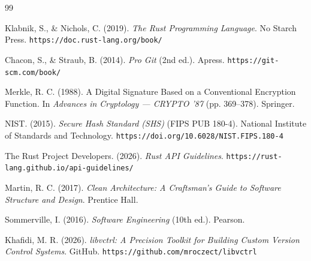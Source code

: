 \documentclass[11pt,a4paper]{article}
\begin{document}
\begin{thebibliography}{99}

	Klabnik, S., \& Nichols, C. (2019).
	\textit{The Rust Programming Language}.
	No Starch Press.
	\texttt{https://doc.rust-lang.org/book/}

	Chacon, S., \& Straub, B. (2014).
	\textit{Pro Git} (2nd ed.).
	Apress.
	\texttt{https://git-scm.com/book/}

	Merkle, R. C. (1988).
	A Digital Signature Based on a Conventional Encryption Function.
	In \textit{Advances in Cryptology --- CRYPTO '87}
	(pp. 369--378). Springer.

	NIST. (2015).
	\textit{Secure Hash Standard (SHS)} (FIPS PUB 180-4).
	National Institute of Standards and Technology.
	\texttt{https://doi.org/10.6028/NIST.FIPS.180-4}

	The Rust Project Developers. (2026).
	\textit{Rust API Guidelines}.
	\texttt{https://rust-lang.github.io/api-guidelines/}

	Martin, R. C. (2017).
	\textit{Clean Architecture: A Craftsman's Guide to Software Structure and Design}.
	Prentice Hall.

	Sommerville, I. (2016).
	\textit{Software Engineering} (10th ed.).
	Pearson.

	Khafidi, M. R. (2026).
	\textit{libvctrl: A Precision Toolkit for Building Custom Version Control Systems}.
	GitHub.
	\texttt{https://github.com/mroczect/libvctrl}

\end{thebibliography}
\end{document}
